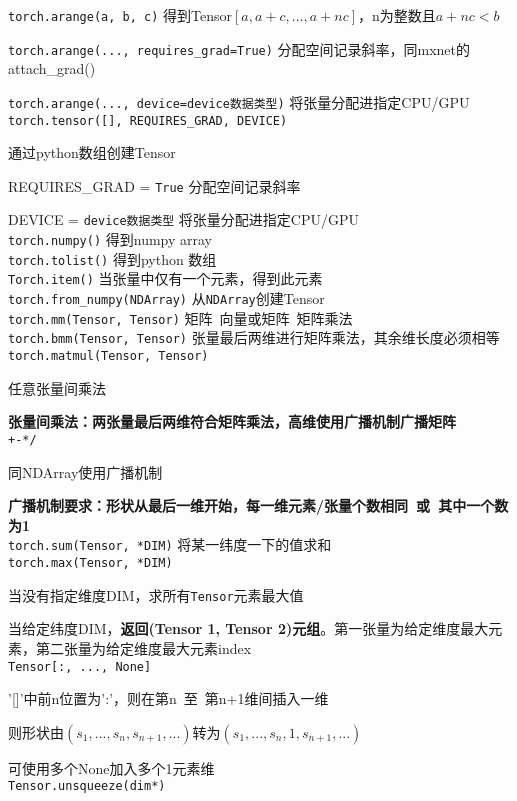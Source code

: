 \documentclass[UTF8]{ctexart}
\begin{document}
  \texttt{torch.arange(a, b, c)} 得到Tensor$[a, a+c, ..., a+nc]$，n为整数且$a+nc < b$
  
  \texttt{torch.arange(..., requires\_grad=True)} 分配空间记录斜率，同mxnet的attach\_grad()
  
  \texttt{torch.arange(..., device=device数据类型)} 将张量分配进指定CPU/GPU\\
\texttt{torch.tensor([], REQUIRES\_GRAD, DEVICE)}
  
  通过python数组创建Tensor

  REQUIRES\_GRAD = \texttt{True} 分配空间记录斜率
  
  DEVICE = \texttt{device数据类型} 将张量分配进指定CPU/GPU\\
\texttt{torch.numpy()} 得到numpy array \\
\texttt{torch.tolist()} 得到python 数组 \\
\texttt{Torch.item()} 当张量中仅有一个元素，得到此元素 \\
\texttt{torch.from\_numpy(NDArray)} 从\texttt{NDArray}创建Tensor\\
\texttt{torch.mm(Tensor, Tensor)} 矩阵\ 向量或矩阵\ 矩阵乘法\\
\texttt{torch.bmm(Tensor, Tensor)} 张量最后两维进行矩阵乘法，其余维长度必须相等\\
\texttt{torch.matmul(Tensor, Tensor)} 

  任意张量间乘法
  
  \textbf{张量间乘法：两张量最后两维符合矩阵乘法，高维使用广播机制广播矩阵}\\
\texttt{+-*/} 

  同NDArray使用广播机制
  
  \textbf{广播机制要求：形状从最后一维开始，每一维元素/张量个数相同\ 或\ 其中一个数为1}\\
\texttt{torch.sum(Tensor, *DIM)} 将某一纬度一下的值求和\\
\texttt{torch.max(Tensor, *DIM)} 

  当没有指定维度DIM，求所有\texttt{Tensor}元素最大值
  
  当给定纬度DIM，\textbf{返回(Tensor 1, Tensor 2)元组}。第一张量为给定维度最大元素，第二张量为给定维度最大元素index\\
\texttt{Tensor[:, ..., None]} 
  
  '[]'中前n位置为':'，则在第n\ 至\ 第n+1维间插入一维

  则形状由$(s_1, ..., s_n, s_{n+1}, ...)$转为$(s_1, ..., s_n, 1, s_{n+1}, ...)$
  
  可使用多个None加入多个1元素维\\
\texttt{Tensor.unsqueeze(dim*)}
\end{document}
